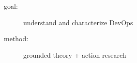 \documentclass{beamer}
\begin{document}
\begin{frame}
\end{frame}

\begin{frame}

  \begin{description}
   \item[goal:] understand and characterize DevOps
   \item[method:] grounded theory + action research 
  \end{description}
\end{frame}
\end{document}
